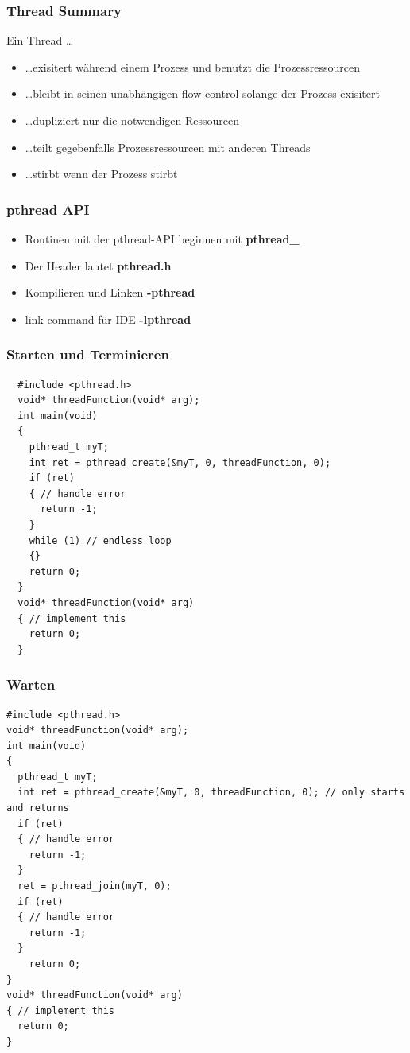 \subsubsection{Thread Summary}
Ein Thread \ldots
\begin{itemize}
  \item \ldots exisitert während einem Prozess und benutzt die Prozessressourcen
  \item \ldots bleibt in seinen unabhängigen flow control solange der Prozess exisitert
  \item \ldots dupliziert nur die notwendigen Ressourcen
  \item \ldots teilt gegebenfalls Prozessressourcen mit anderen Threads
  \item \ldots stirbt wenn der Prozess stirbt
\end{itemize}

\newpage

\subsubsection{pthread API}
\begin{itemize}
  \item Routinen mit der pthread-API beginnen mit \textbf{pthread\_}
  \item Der Header lautet \textbf{pthread.h}
  \item Kompilieren und Linken \textbf{-pthread}
  \item link command für IDE \textbf{-lpthread}
\end{itemize}

\subsubsection{Starten und Terminieren}
\begin{lstlisting}
  #include <pthread.h>
  void* threadFunction(void* arg);
  int main(void)
  {
    pthread_t myT;
    int ret = pthread_create(&myT, 0, threadFunction, 0);
    if (ret)
    { // handle error
      return -1;
    }
    while (1) // endless loop
    {}
    return 0;
  }
  void* threadFunction(void* arg)
  { // implement this
    return 0;
  }
\end{lstlisting}

\subsubsection{Warten}
\begin{lstlisting}
#include <pthread.h>
void* threadFunction(void* arg);
int main(void)
{
  pthread_t myT;
  int ret = pthread_create(&myT, 0, threadFunction, 0); // only starts and returns
  if (ret)
  { // handle error
    return -1;
  }
  ret = pthread_join(myT, 0);
  if (ret)
  { // handle error
    return -1;
  }
    return 0;
}
void* threadFunction(void* arg)
{ // implement this
  return 0;
}
\end{lstlisting}

